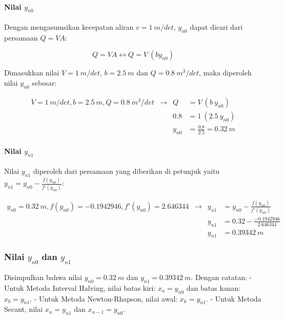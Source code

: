 \documentclass[11pt]{article}
\begin{document}
\paragraph{\texorpdfstring{Nilai
\(y_{n0}\)}{Nilai y\_\{n0\}}}\label{nilai-y_n0}

Dengan mengasumsikan kecepatan aliran \(v = 1\ m/det\), \(y_{n0}\) dapat
dicari dari persamaan \(Q = VA\):

\[Q = VA \leftrightarrow Q = V\ (by_{n0})\]

Dimasukkan nilai \(V = 1\ m/det\), \(b = 2.5\ m\) dan
\(Q = 0.8\ m^3/det\), maka diperoleh nilai \(y_{n0}\) sebesar:

\[\begin{aligned} V = 1\ m/det, b = 2.5\ m, Q = 0.8\ m^3/det &\rightarrow& Q &= V\ (b\ y_{n0}) \\
&& 0.8 &= 1\ (2.5\ y_{n0}) \\
&& y_{n0} &= \frac{0.8}{2.5} = 0.32\ m
\end{aligned}\]

\paragraph{\texorpdfstring{Nilai
\(y_{n1}\)}{Nilai y\_\{n1\}}}\label{nilai-y_n1}

Nilai \(y_{n1}\) diperoleh dari persamaan yang diberikan di petunjuk
yaitu \(y_{n1} = y_{n0}-\frac{f(y_{n0})}{f'(y_{n0})}\):

\[\begin{aligned} y_{n0} = 0.32\ m, f(y_{n0}) = -0.1942946, f'(y_{n0}) = 2.646344 &\rightarrow& y_{n1} &= y_{n0}-\frac{f(y_{n0})}{f'(y_{n0})} \\
&& y_{n1} &= 0.32 - \frac{-0.1942946}{2.646344} \\
&& y_{n1} &= 0.39342\ m
\end{aligned}\]

\subsubsection{\texorpdfstring{Nilai \(y_{n0}\) dan
\(y_{n1}\)}{Nilai y\_\{n0\} dan y\_\{n1\}}}\label{nilai-y_n0-dan-y_n1}

Disimpulkan bahwa nilai \(y_{n0} = 0.32\ m\) dan
\(y_{n1} = 0.39342\ m\). Dengan catatan: - Untuk Metoda Interval
Halving, nilai batas kiri: \(x_a = y_{n0}\) dan batas kanan:
\(x_b = y_{n1}\). - Untuk Metoda Newton-Rhapson, nilai awal:
\(x_k = y_{n1}\). - Untuk Metoda Secant, nilai \(x_n = y_{n1}\) dan
\(x_{n-1} = y_{n0}\).
\end{document}
